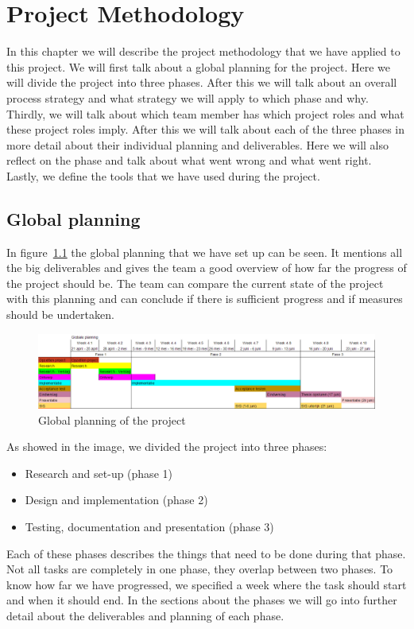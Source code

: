 \chapter{Project Methodology}
\label{sec:methodology}
In this chapter we will describe the project methodology that we have applied to this project.
We will first talk about a global planning for the project.
Here we will divide the project into three phases.
After this we will talk about an overall process strategy and what strategy we will apply to which phase and why.
Thirdly, we will talk about which team member has which project roles and what these project roles imply.
After this we will talk about each of the three phases in more detail about their individual planning and deliverables.
Here we will also reflect on the phase and talk about what went wrong and what went right.
Lastly, we define the tools that we have used during the project.

\section{Global planning}
In figure~\ref{global_planning} the global planning that we have set up can be seen.
It mentions all the big deliverables and gives the team a good overview of how far the progress of the project should be.
The team can compare the current state of the project with this planning and can conclude if there is sufficient progress and if measures should be undertaken.

\begin{figure}[h]
    \centering
    \includegraphics[width=\textwidth]{images/Global_planning}
    \caption{Global planning of the project}
    \label{global_planning}
\end{figure}

As showed in the image, we divided the project into three phases:
\begin{itemize}
\item Research and set-up (phase 1)
\item Design and implementation (phase 2)
\item Testing, documentation and presentation (phase 3)
\end{itemize}
Each of these phases describes the things that need to be done during that phase.
Not all tasks are completely in one phase, they overlap between two phases.
To know how far we have progressed, we specified a week where the task should start and when it should end.
In the sections about the phases we will go into further detail about the deliverables and planning of each phase.

